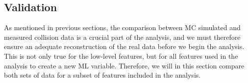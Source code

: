 \subsection*{Validation}\label{subsec:Validation}
As mentioned in previous sections, the comparison between \ac{MC} simulated and measured collision data is a crucial part of the 
analysis, and we must therefore ensure an adequate reconstruction of the real data before we begin the analysis. This is not only 
true for the low-level features, but for all features used in the analysis to create a new \ac{ML} variable. Therefore, 
we will in this section compare both sets of data for a subset of features included in the analysis.
\begin{figure}[H]
    \renewcommand\figurename{Table}
    \centering
\end{figure}
